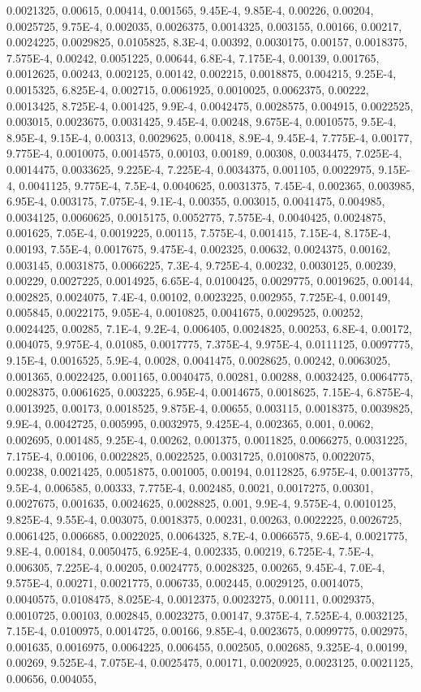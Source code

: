 0.0021325, 0.00615, 0.00414, 0.001565, 9.45E-4, 9.85E-4, 0.00226, 0.00204, 0.0025725, 9.75E-4, 0.002035, 0.0026375, 0.0014325, 0.003155, 0.00166, 0.00217, 0.0024225, 0.0029825, 0.0105825, 8.3E-4, 0.00392, 0.0030175, 0.00157, 0.0018375, 7.575E-4, 0.00242, 0.0051225, 0.00644, 6.8E-4, 7.175E-4, 0.00139, 0.001765, 0.0012625, 0.00243, 0.002125, 0.00142, 0.002215, 0.0018875, 0.004215, 9.25E-4, 0.0015325, 6.825E-4, 0.002715, 0.0061925, 0.0010025, 0.0062375, 0.00222, 0.0013425, 8.725E-4, 0.001425, 9.9E-4, 0.0042475, 0.0028575, 0.004915, 0.0022525, 0.003015, 0.0023675, 0.0031425, 9.45E-4, 0.00248, 9.675E-4, 0.0010575, 9.5E-4, 8.95E-4, 9.15E-4, 0.00313, 0.0029625, 0.00418, 8.9E-4, 9.45E-4, 7.775E-4, 0.00177, 9.775E-4, 0.0010075, 0.0014575, 0.00103, 0.00189, 0.00308, 0.0034475, 7.025E-4, 0.0014475, 0.0033625, 9.225E-4, 7.225E-4, 0.0034375, 0.001105, 0.0022975, 9.15E-4, 0.0041125, 9.775E-4, 7.5E-4, 0.0040625, 0.0031375, 7.45E-4, 0.002365, 0.003985, 6.95E-4, 0.003175, 7.075E-4, 9.1E-4, 0.00355, 0.003015, 0.0041475, 0.004985, 0.0034125, 0.0060625, 0.0015175, 0.0052775, 7.575E-4, 0.0040425, 0.0024875, 0.001625, 7.05E-4, 0.0019225, 0.00115, 7.575E-4, 0.001415, 7.15E-4, 8.175E-4, 0.00193, 7.55E-4, 0.0017675, 9.475E-4, 0.002325, 0.00632, 0.0024375, 0.00162, 0.003145, 0.0031875, 0.0066225, 7.3E-4, 9.725E-4, 0.00232, 0.0030125, 0.00239, 0.00229, 0.0027225, 0.0014925, 6.65E-4, 0.0100425, 0.0029775, 0.0019625, 0.00144, 0.002825, 0.0024075, 7.4E-4, 0.00102, 0.0023225, 0.002955, 7.725E-4, 0.00149, 0.005845, 0.0022175, 9.05E-4, 0.0010825, 0.0041675, 0.0029525, 0.00252, 0.0024425, 0.00285, 7.1E-4, 9.2E-4, 0.006405, 0.0024825, 0.00253, 6.8E-4, 0.00172, 0.004075, 9.975E-4, 0.01085, 0.0017775, 7.375E-4, 9.975E-4, 0.0111125, 0.0097775, 9.15E-4, 0.0016525, 5.9E-4, 0.0028, 0.0041475, 0.0028625, 0.00242, 0.0063025, 0.001365, 0.0022425, 0.001165, 0.0040475, 0.00281, 0.00288, 0.0032425, 0.0064775, 0.0028375, 0.0061625, 0.003225, 6.95E-4, 0.0014675, 0.0018625, 7.15E-4, 6.875E-4, 0.0013925, 0.00173, 0.0018525, 9.875E-4, 0.00655, 0.003115, 0.0018375, 0.0039825, 9.9E-4, 0.0042725, 0.005995, 0.0032975, 9.425E-4, 0.002365, 0.001, 0.0062, 0.002695, 0.001485, 9.25E-4, 0.00262, 0.001375, 0.0011825, 0.0066275, 0.0031225, 7.175E-4, 0.00106, 0.0022825, 0.0022525, 0.0031725, 0.0100875, 0.0022075, 0.00238, 0.0021425, 0.0051875, 0.001005, 0.00194, 0.0112825, 6.975E-4, 0.0013775, 9.5E-4, 0.006585, 0.00333, 7.775E-4, 0.002485, 0.0021, 0.0017275, 0.00301, 0.0027675, 0.001635, 0.0024625, 0.0028825, 0.001, 9.9E-4, 9.575E-4, 0.0010125, 9.825E-4, 9.55E-4, 0.003075, 0.0018375, 0.00231, 0.00263, 0.0022225, 0.0026725, 0.0061425, 0.006685, 0.0022025, 0.0064325, 8.7E-4, 0.0066575, 9.6E-4, 0.0021775, 9.8E-4, 0.00184, 0.0050475, 6.925E-4, 0.002335, 0.00219, 6.725E-4, 7.5E-4, 0.006305, 7.225E-4, 0.00205, 0.0024775, 0.0028325, 0.00265, 9.45E-4, 7.0E-4, 9.575E-4, 0.00271, 0.0021775, 0.006735, 0.002445, 0.0029125, 0.0014075, 0.0040575, 0.0108475, 8.025E-4, 0.0012375, 0.0023275, 0.00111, 0.0029375, 0.0010725, 0.00103, 0.002845, 0.0023275, 0.00147, 9.375E-4, 7.525E-4, 0.0032125, 7.15E-4, 0.0100975, 0.0014725, 0.00166, 9.85E-4, 0.0023675, 0.0099775, 0.002975, 0.001635, 0.0016975, 0.0064225, 0.006455, 0.002505, 0.002685, 9.325E-4, 0.00199, 0.00269, 9.525E-4, 7.075E-4, 0.0025475, 0.00171, 0.0020925, 0.0023125, 0.0021125, 0.00656, 0.004055, 
